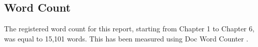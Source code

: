 \begin{appendices}
\clearpage


\section{Word Count}
\label{count}

The registered word count for this report, starting from Chapter 1 to Chapter 6, was equal to 15,101 words.  This has been measured using Doc Word Counter \cite{count_w}.

\end{appendices}